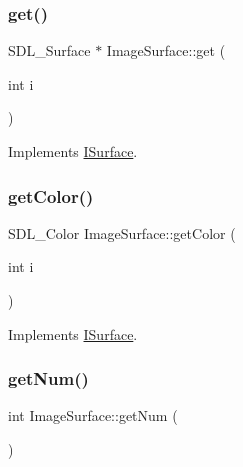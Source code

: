 \subsubsection{\texorpdfstring{get()}{get()}}
{\footnotesize\ttfamily S\+D\+L\+\_\+\+Surface $\ast$ Image\+Surface\+::get (\begin{DoxyParamCaption}\item[{int}]{i }\end{DoxyParamCaption})\hspace{0.3cm}{\ttfamily [virtual]}}



Implements \mbox{\hyperlink{class_i_surface_a45bacb1ffa6f0835e3ece0123b90c4fc}{I\+Surface}}.

\mbox{\label{class_image_surface_a241efe1b9a9cc78e5033f8beff36eb03}} 
\subsubsection{\texorpdfstring{get\+Color()}{getColor()}}
{\footnotesize\ttfamily S\+D\+L\+\_\+\+Color Image\+Surface\+::get\+Color (\begin{DoxyParamCaption}\item[{int}]{i }\end{DoxyParamCaption})\hspace{0.3cm}{\ttfamily [virtual]}}



Implements \mbox{\hyperlink{class_i_surface_adf609edb8f871bf37ed9aaf8fe0d2695}{I\+Surface}}.

\mbox{\label{class_image_surface_a6c503dc8cdc23ff1781309c430506e93}} 
\subsubsection{\texorpdfstring{get\+Num()}{getNum()}}
{\footnotesize\ttfamily int Image\+Surface\+::get\+Num (\begin{DoxyParamCaption}{ }\end{DoxyParamCaption})\hspace{0.3cm}{\ttfamily [virtual]}}



